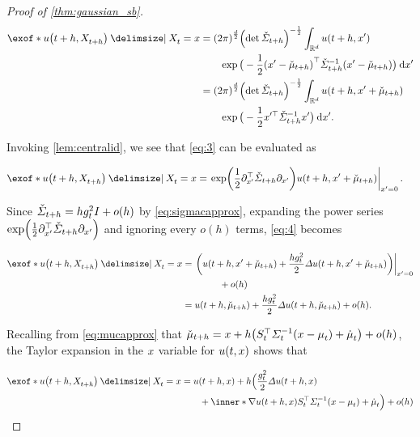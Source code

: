 \begin{proof}[Proof of \cref{thm:gaussian_sb}]
\begin{align}
\nn
\exof*{ \testf[\ctime+h][\Xsol[\ctime+h]] \given \Xsol = \point  } &=  \Nconst  \parens*{\det \Sigmac}^{-\frac{1}{2}} \intR \testf[\ctime+h][\pointalt] \\
&\qquad \exp\big( -\frac{1}{2} \parens*{\pointalt - \muc}^\top \Sigmacinv\parens*{\pointalt - \muc}\big) \dd \pointalt \\
\nn
&= \Nconst\parens*{\det \Sigmac}^{-\frac{1}{2}} \intR \testf[\ctime+h][\pointalt + \muc]  \\
\label{eq:3}
&\qquad  \exp\big( -\frac{1}{2} \pointalt^\top \Sigmacinv\pointalt \big) \dd \pointalt.
\end{align}

Invoking \cref{lem:centralid}, we see that \eqref{eq:3} can be evaluated as

\begin{align}
\label{eq:4}
\exof*{ \testf[\ctime+h][\Xsol[\ctime+h]] \given \Xsol = \point  } &=  \left.\exp\parens*{ \frac{1}{2} \del_{\pointalt}^\top \Sigmac \del_{\pointalt}}  \testf[\ctime+h][\pointalt + \muc]\right\vert_{\pointalt = 0}.
\end{align}

Since $\Sigmac = h\volatsq[\ctime]\eye + o(h) $ by \eqref{eq:sigmacapprox}, expanding the power series $\exp\parens*{ \frac{1}{2} \del_{\pointalt}^\top \Sigmac \del_{\pointalt}} $ and ignoring every $o(h)$ terms, \eqref{eq:4} becomes

\begin{align}
\nn
\exof*{ \testf[\ctime+h][\Xsol[\ctime+h]] \given \Xsol = \point  } &=  \left. \parens*{\testf[\ctime+h][\pointalt + \muc] + \frac{h\volatsq[\ctime]}{2}\Laplace \testf[\ctime+h][\pointalt + \muc]}\right\vert_{\pointalt = 0}  \\
\nn
&\qquad\qquad+ o(h) \\
\label{eq:5}
&= \testf[\ctime+h][ \muc] + \frac{h\volatsq[\ctime]}{2}\Laplace \testf[\ctime+h][ \muc] + o(h).
\end{align}

Recalling from \eqref{eq:mucapprox} that $\muc = \point + h \parens*{  \St^\top \Sigmasolinv\parens*{ \point - \meansol  } + \dmeansol } + o(h)$, the Taylor expansion in the $\point$ variable for $\testf$ shows that 

\begin{align}
\nn
\exof*{ \testf[\ctime+h][\Xsol[\ctime+h]] \given \Xsol = \point  } &= \testf[\ctime+h][\point] + h\Big( \frac{\volatsq[\ctime]}{2}\Laplace \testf[\ctime+h][ \point] \\
	&\qquad + \inner*{ \nabla \testf[\ctime+h][\point]}{ \St^\top \Sigmasolinv\parens*{ \point - \meansol  } + \dmeansol } \Big) + o(h)
\end{align}


\end{proof}
